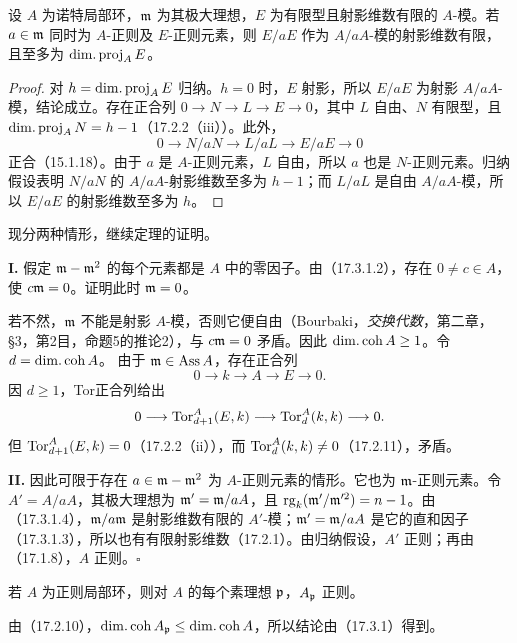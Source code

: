 设 $A$ 为诺特局部环，$\mathfrak m$ 为其极大理想，$E$ 为有限型且射影维数有限的 $A$-模。若 $a\in\mathfrak m$ 同时为 $A$-正则及 $E$-正则元素，则 $E/aE$ 作为 $A/aA$-模的射影维数有限，且至多为 $\operatorname{dim.proj}_AE$。
\begin{proof}
对 $h=\operatorname{dim.proj}_AE$ 归纳。$h=0$ 时，$E$ 射影，所以 $E/aE$ 为射影 $A/aA$-模，结论成立。存在正合列
$0\to N\to L\to E\to0$，其中 $L$ 自由、$N$ 有限型，且 $\operatorname{dim.proj}_AN=h-1$（17.2.2（iii））。此外，
\[
 0\longrightarrow N/aN\longrightarrow L/aL\longrightarrow E/aE\longrightarrow0
\]
正合（15.1.18）。由于 $a$ 是 $A$-正则元素，$L$ 自由，所以 $a$ 也是 $N$-正则元素。归纳假设表明 $N/aN$ 的 $A/aA$-射影维数至多为 $h-1$；而 $L/aL$ 是自由 $A/aA$-模，所以 $E/aE$ 的射影维数至多为 $h$。
\end{proof}
现分两种情形，继续定理的证明。

\noindent\textbf{I.}
假定 $\mathfrak m-\mathfrak m^2$ 的每个元素都是 $A$ 中的零因子。由（17.3.1.2），存在 $0\ne c\in A$，使 $c\mathfrak m=0$。证明此时 $\mathfrak m=0$。

若不然，$\mathfrak m$ 不能是射影 $A$-模，否则它便自由（Bourbaki，\textit{交换代数}，第二章，§3，第2目，命题5的推论2），与 $c\mathfrak m=0$ 矛盾。因此 $\operatorname{dim.coh} A\geq1$。令 $d=\operatorname{dim.coh} A$。
由于 $\mathfrak m\in\operatorname{Ass} A$，存在正合列
\[
 0\longrightarrow k\longrightarrow A\longrightarrow E\longrightarrow0.
\]
因 $d\geq1$，Tor正合列给出
\[
 0\longrightarrow\operatorname{Tor}_{d+1}^A(E,k)\longrightarrow\operatorname{Tor}_d^A(k,k)\longrightarrow0.
\]
但 $\operatorname{Tor}_{d+1}^A(E,k)=0$（17.2.2（ii）），而 $\operatorname{Tor}_d^A(k,k)\ne0$（17.2.11），矛盾。

\noindent\textbf{II.}
因此可限于存在 $a\in\mathfrak m-\mathfrak m^2$ 为 $A$-正则元素的情形。它也为 $\mathfrak m$-正则元素。令 $A'=A/aA$，其极大理想为 $\mathfrak m'=\mathfrak m/aA$，且
$\operatorname{rg}_k(\mathfrak m'/\mathfrak m'^2)=n-1$。由（17.3.1.4），$\mathfrak m/a\mathfrak m$ 是射影维数有限的 $A'$-模；$\mathfrak m'=\mathfrak m/aA$ 是它的直和因子（17.3.1.3），所以也有有限射影维数（17.2.1）。由归纳假设，$A'$ 正则；再由（17.1.8），$A$ 正则。\hfill$\square$

若 $A$ 为正则局部环，则对 $A$ 的每个素理想 $\mathfrak p$，$A_{\mathfrak p}$ 正则。

由（17.2.10），$\operatorname{dim.coh} A_{\mathfrak p}\leq\operatorname{dim.coh} A$，所以结论由（17.3.1）得到。

